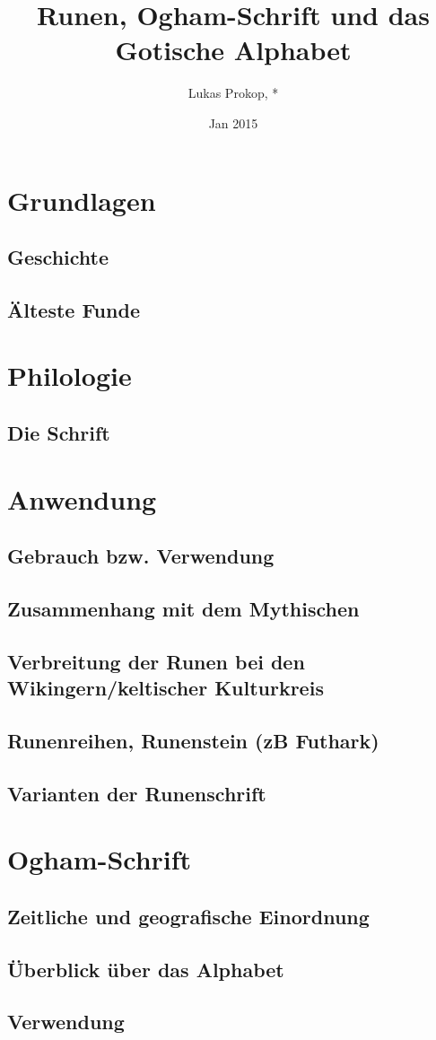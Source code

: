\documentclass[a4paper]{article}
\author{Lukas Prokop, *}
\title{Runen, Ogham-Schrift und das Gotische Alphabet}
\date{Jan 2015}
\begin{document}
\maketitle
\tableofcontents

\section{Grundlagen}
\subsection{Geschichte}
\subsection{Älteste Funde}

\section{Philologie}
\subsection{Die Schrift}


\section{Anwendung}
\subsection{Gebrauch bzw. Verwendung}
\subsection{Zusammenhang mit dem Mythischen}
\subsection{Verbreitung der Runen bei den Wikingern/keltischer Kulturkreis}
\subsection{Runenreihen, Runenstein (zB Futhark)}
\subsection{Varianten der Runenschrift}

\section{Ogham-Schrift}
\subsection{Zeitliche und geografische Einordnung}
\subsection{Überblick über das Alphabet}
\subsection{Verwendung}

\printbibliography
\end{document}
